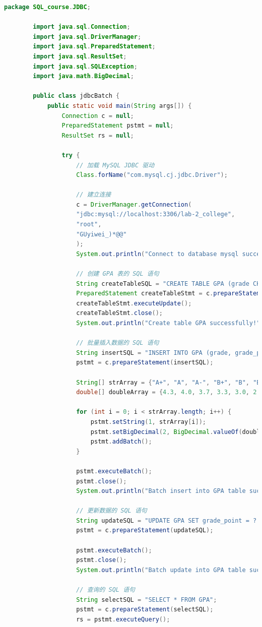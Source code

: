 \documentclass{article}
\begin{document}
	\begin{lstlisting}[language=java, title=jdbcBatch, tabsize=4]
		package SQL_course.JDBC;
		
		import java.sql.Connection;
		import java.sql.DriverManager;
		import java.sql.PreparedStatement;
		import java.sql.ResultSet;
		import java.sql.SQLException;
		import java.math.BigDecimal;
		
		public class jdbcBatch {
			public static void main(String args[]) {
				Connection c = null;
				PreparedStatement pstmt = null;
				ResultSet rs = null;
				
				try {
					// 加载 MySQL JDBC 驱动
					Class.forName("com.mysql.cj.jdbc.Driver");
					
					// 建立连接
					c = DriverManager.getConnection(
					"jdbc:mysql://localhost:3306/lab-2_college",
					"root",
					"GUyiwei_)*@@"
					);
					System.out.println("Connect to database mysql successfully!");
					
					// 创建 GPA 表的 SQL 语句
					String createTableSQL = "CREATE TABLE GPA (grade CHAR(2), grade_point DECIMAL(3,2))";
					PreparedStatement createTableStmt = c.prepareStatement(createTableSQL);
					createTableStmt.executeUpdate();
					createTableStmt.close();
					System.out.println("Create table GPA successfully!");
					
					// 批量插入数据的 SQL 语句
					String insertSQL = "INSERT INTO GPA (grade, grade_point) VALUES (?, ?)";
					pstmt = c.prepareStatement(insertSQL);
					
					String[] strArray = {"A+", "A", "A-", "B+", "B", "B-", "C+", "C", "C-", "D", "D-", "F"};
					double[] doubleArray = {4.3, 4.0, 3.7, 3.3, 3.0, 2.7, 2.3, 2.0, 1.5, 1.3, 1.0, 0};
					
					for (int i = 0; i < strArray.length; i++) {
						pstmt.setString(1, strArray[i]);
						pstmt.setBigDecimal(2, BigDecimal.valueOf(doubleArray[i]));
						pstmt.addBatch();
					}
					
					pstmt.executeBatch();
					pstmt.close();
					System.out.println("Batch insert into GPA table successfully!");
					
					// 更新数据的 SQL 语句
					String updateSQL = "UPDATE GPA SET grade_point = ? WHERE grade = ?";
					pstmt = c.prepareStatement(updateSQL);
					
					pstmt.executeBatch();
					pstmt.close();
					System.out.println("Batch update into GPA table successfully!");
					
					// 查询的 SQL 语句
					String selectSQL = "SELECT * FROM GPA";
					pstmt = c.prepareStatement(selectSQL);
					rs = pstmt.executeQuery();
					

\end{lstlisting}
\end{document}
